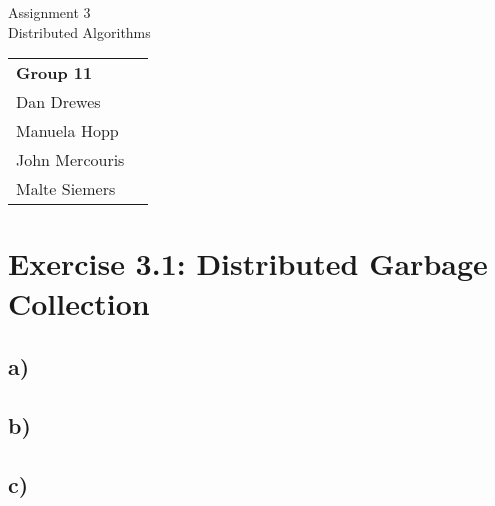 \documentclass[12pt,a4paper]{article}
\begin{document}
\begin{center}
  \Large Assignment 3\\
  \large Distributed Algorithms
\end{center}
\begin{flushright}
  \begin{tabular}{ll}
    \textbf{Group 11} \\
    Dan Drewes        \\ 
    Manuela Hopp      \\ 
    John Mercouris    \\
    Malte Siemers     \\
  \end{tabular} 
\end{flushright}

\section*{Exercise 3.1: Distributed Garbage Collection}
  \subsection*{a)} %
  \subsection*{b)} %
  \subsection*{c)} %
\end{document}
